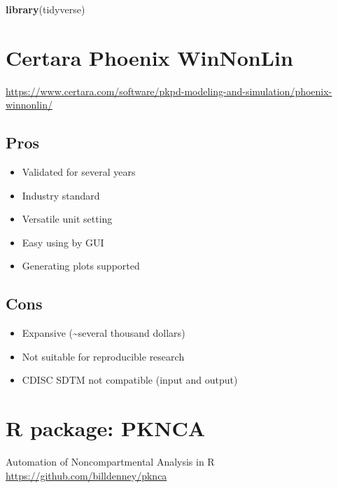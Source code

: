 \documentclass[12pt,]{krantz}
\newenvironment{Shaded}{\begin{snugshade}}{\end{snugshade}}
\newcommand{\KeywordTok}[1]{\textcolor[rgb]{0.13,0.29,0.53}{\textbf{#1}}}
\newcommand{\NormalTok}[1]{#1}
\providecommand{\tightlist}{%
  \setlength{\itemsep}{0pt}\setlength{\parskip}{0pt}}
\begin{document}
\begin{Shaded}
\begin{Highlighting}[]
\KeywordTok{library}\NormalTok{(tidyverse)}
\end{Highlighting}
\end{Shaded}

\hypertarget{certara-phoenix-winnonlin}{%
\section{Certara Phoenix WinNonLin}\label{certara-phoenix-winnonlin}}

\url{https://www.certara.com/software/pkpd-modeling-and-simulation/phoenix-winnonlin/}

\hypertarget{pros}{%
\subsection{Pros}\label{pros}}

\begin{itemize}
\tightlist
\item
  Validated for several years
\item
  Industry standard
\item
  Versatile unit setting
\item
  Easy using by GUI
\item
  Generating plots supported
\end{itemize}

\hypertarget{cons}{%
\subsection{Cons}\label{cons}}

\begin{itemize}
\tightlist
\item
  Expansive (\textasciitilde several thousand dollars)
\item
  Not suitable for reproducible research
\item
  CDISC SDTM not compatible (input and output)
\end{itemize}

\hypertarget{r-package-pknca}{%
\section{R package: PKNCA}\label{r-package-pknca}}

Automation of Noncompartmental Analysis in R \url{https://github.com/billdenney/pknca}
\end{document}
